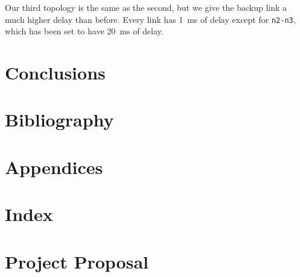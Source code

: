 \documentclass[10pt,twoside,a4paper]{article}
\begin{document}
\pagebreak

Our third topology is the same as the second, but we give the backup link a much higher delay than before. Every link has \SI{1}{\ms} of delay except for \texttt{n2-n3}, which has been set to have \SI{20}{\ms} of delay.

\section{Conclusions}

\section{Bibliography}

\section{Appendices}

\section{Index}

\section{Project Proposal}
\end{document}
